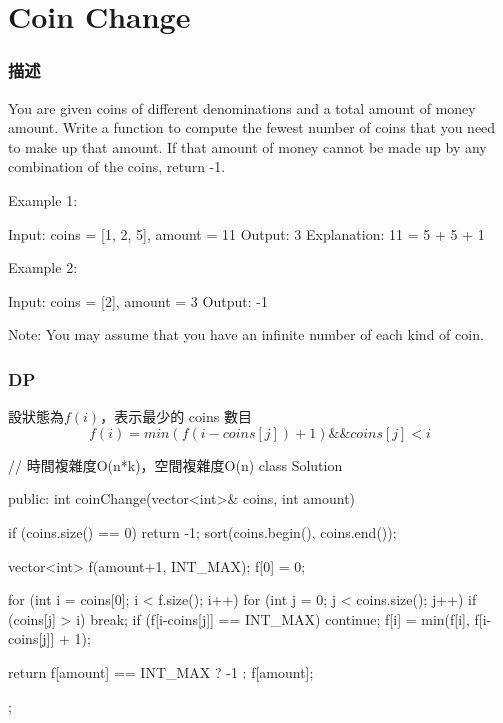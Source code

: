 \section{Coin Change} %
\label{sec:coin-change}

\subsubsection{描述}
You are given coins of different denominations and a total amount of money amount. Write a function to compute the fewest number of coins that you need to make up that amount. If that amount of money cannot be made up by any combination of the coins, return -1.

Example 1:
\begin{Code}
Input: coins = [1, 2, 5], amount = 11
Output: 3 
Explanation: 11 = 5 + 5 + 1
\end{Code}

Example 2:
\begin{Code}
Input: coins = [2], amount = 3
Output: -1
\end{Code}

Note:
You may assume that you have an infinite number of each kind of coin.

\subsubsection{DP}
設狀態為$f(i)$，表示最少的 coins 數目
$$
f(i) = min(f(i-coins[j]) + 1) \&\& coins[j] < i
$$

\begin{Code}
// 時間複雜度O(n*k)，空間複雜度O(n)
class Solution {
public:
    int coinChange(vector<int>& coins, int amount) {
        if (coins.size() == 0) return -1;
        sort(coins.begin(), coins.end());

        vector<int> f(amount+1, INT_MAX);
        f[0] = 0;

        for (int i = coins[0]; i < f.size(); i++)
        {
            for (int j = 0; j < coins.size(); j++)
            {
                if (coins[j] > i) break;
                if (f[i-coins[j]] == INT_MAX) continue;
                f[i] = min(f[i], f[i-coins[j]] + 1);
            }
        }

        return f[amount] == INT_MAX ?  -1 : f[amount];
    }
};
\end{Code}


